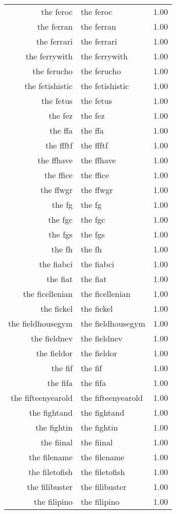 \begin{table}[ht]
\begin{tabular}{rlr}
  the feroc & the feroc & 1.00 \\ 
  the ferran & the ferran & 1.00 \\ 
  the ferrari & the ferrari & 1.00 \\ 
  the ferrywith & the ferrywith & 1.00 \\ 
  the ferucho & the ferucho & 1.00 \\ 
  the fetishistic & the fetishistic & 1.00 \\ 
  the fetus & the fetus & 1.00 \\ 
  the fez & the fez & 1.00 \\ 
  the ffa & the ffa & 1.00 \\ 
  the ffftf & the ffftf & 1.00 \\ 
  the ffhave & the ffhave & 1.00 \\ 
  the ffice & the ffice & 1.00 \\ 
  the ffwgr & the ffwgr & 1.00 \\ 
  the fg & the fg & 1.00 \\ 
  the fgc & the fgc & 1.00 \\ 
  the fgs & the fgs & 1.00 \\ 
  the fh & the fh & 1.00 \\ 
  the fiabci & the fiabci & 1.00 \\ 
  the fiat & the fiat & 1.00 \\ 
  the ficellenian & the ficellenian & 1.00 \\ 
  the fickel & the fickel & 1.00 \\ 
  the fieldhousegym & the fieldhousegym & 1.00 \\ 
  the fieldnev & the fieldnev & 1.00 \\ 
  the fieldor & the fieldor & 1.00 \\ 
  the fif & the fif & 1.00 \\ 
  the fifa & the fifa & 1.00 \\ 
  the fifteenyearold & the fifteenyearold & 1.00 \\ 
  the fightand & the fightand & 1.00 \\ 
  the fightin & the fightin & 1.00 \\ 
  the fiinal & the fiinal & 1.00 \\ 
  the filename & the filename & 1.00 \\ 
  the filetofish & the filetofish & 1.00 \\ 
  the filibuster & the filibuster & 1.00 \\ 
  the filipino & the filipino & 1.00 \\ 

\end{tabular}
\end{table}
